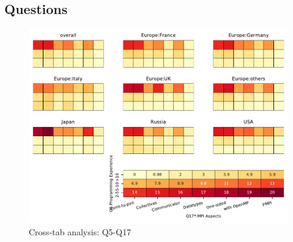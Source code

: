
\subsection{Questions}


\begin{figure}
\begin{center}
\includegraphics[width=12cm]{../pdfs/Q5-Q17.pdf}
\caption{Cross-tab analysis: Q5-Q17}
\label{fig:Q5-Q17}
\end{center}
\end{figure}

